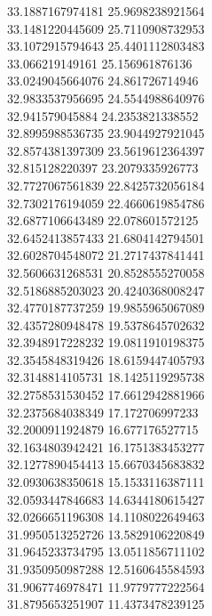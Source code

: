 {33.1887167974181	25.9698238921564\\
33.1481220445609	25.7110908732953\\
33.1072915794643	25.4401112803483\\
33.066219149161	25.156961876136\\
33.0249045664076	24.861726714946\\
32.9833537956695	24.5544988640976\\
32.941579045884	24.2353821338552\\
32.8995988536735	23.9044927921045\\
32.8574381397309	23.5619612364397\\
32.815128220397	23.2079335926773\\
32.7727067561839	22.8425732056184\\
32.7302176194059	22.4660619854786\\
32.6877106643489	22.078601572125\\
32.6452413857433	21.6804142794501\\
32.6028704548072	21.2717437841441\\
32.5606631268531	20.8528555270058\\
32.5186885203023	20.4240368008247\\
32.4770187737259	19.9855965067089\\
32.4357280948478	19.5378645702632\\
32.3948917228232	19.0811910198375\\
32.3545848319426	18.6159447405793\\
32.3148814105731	18.1425119295738\\
32.2758531530452	17.6612942881966\\
32.2375684038349	17.172706997233\\
32.2000911924879	16.677176527715\\
32.1634803942421	16.1751383453277\\
32.1277890454413	15.6670345683832\\
32.0930638350618	15.1533116387111\\
32.0593447846683	14.6344180615427\\
32.0266651196308	14.1108022649463\\
31.9950513252726	13.5829106220849\\
31.9645233734795	13.0511856711102\\
31.9350950987288	12.5160645584593\\
31.9067746978471	11.9779777222564\\
31.8795653251907	11.4373478239125\\
}
